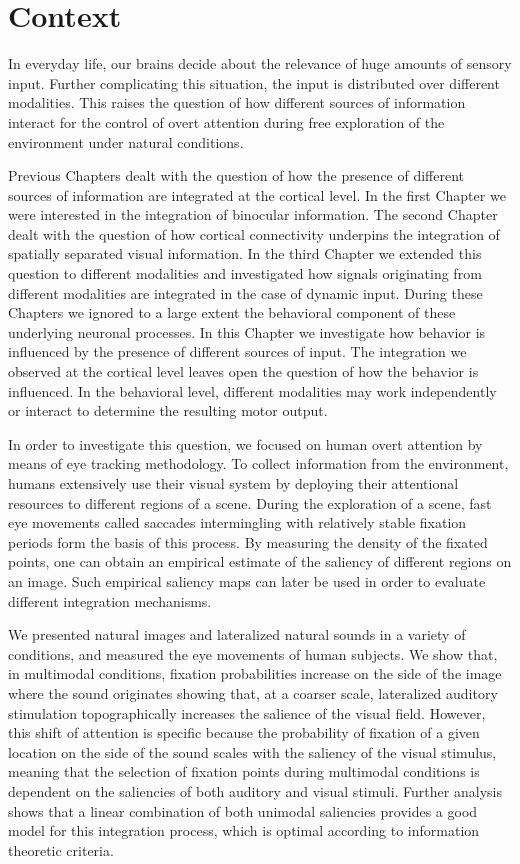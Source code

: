 
\section{Context} 

In everyday life, our brains decide about the relevance of huge amounts of
sensory input. Further complicating this situation, the input is
distributed over different modalities. This raises the question of how
different sources of information interact for the control of overt
attention during free exploration of the environment under natural
conditions.

Previous Chapters dealt with the question of how the presence of different
sources of information are integrated at the cortical level. In the first
Chapter we were interested in the integration of binocular information. The
second Chapter dealt with the question of how cortical connectivity
underpins the integration of spatially separated visual information. In the
third Chapter we extended this question to different modalities and
investigated how signals originating from different modalities are
integrated in the case of dynamic input. During these Chapters we ignored
to a large extent the behavioral component of these underlying neuronal
processes. In this Chapter we investigate how behavior is influenced by the
presence of different sources of input. The integration we observed at the
cortical level leaves open the question of how the behavior is influenced.
In the behavioral level, different modalities may work independently or
interact to determine the resulting motor output. 


In order to investigate this question, we focused on human overt attention
by means of eye tracking methodology. To collect information from the
environment, humans extensively use their visual system by deploying their
attentional resources to different regions of a scene. During the
exploration of a scene, fast eye movements called saccades intermingling
with relatively stable fixation periods form the basis of this process. By
measuring the density of the fixated points, one can obtain an empirical
estimate of the saliency of different regions on an image. Such empirical
saliency maps can later be used in order to evaluate different integration
mechanisms.

We presented natural images and lateralized natural sounds in a variety of
conditions, and measured the eye movements of human subjects. We show that,
in multimodal conditions, fixation probabilities increase on the side of
the image where the sound originates showing that, at a coarser scale,
lateralized auditory stimulation topographically increases the salience of
the visual field. However, this shift of attention is specific because the
probability of fixation of a given location on the side of the sound scales
with the saliency of the visual stimulus, meaning that the selection of
fixation points during multimodal conditions is dependent on the saliencies
of both auditory and visual stimuli. Further analysis shows that a linear
combination of both unimodal saliencies provides a good model for this
integration process, which is optimal according to information theoretic
criteria. 

